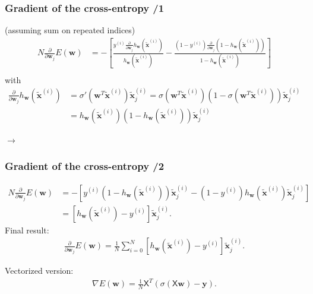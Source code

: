 \documentclass{beamer}
\begin{document}
	\begin{frame}
		\frametitle{Gradient of the cross-entropy /1}
	
		(assuming sum on repeated indices)
		\begin{align*}
			N\frac{\partial}{\partial \bm{w}_j} E(\bm{w}) &= - \left[\frac{y^{(i)} \frac{\partial}{\partial \bm{w}_j}h_{\bm{w}}(\tilde{\bm{x}}^{(i)})}{h_{\bm{w}}(\tilde{\bm{x}}^{(i)})} - \frac{(1-y^{(i)}) \frac{\partial}{\partial \bm{w}_j}(1 -h_{\bm{w}}(\tilde{\bm{x}}^{(i)}))}{1-h_{\bm{w}}(\tilde{\bm{x}}^{(i)})}\right]\\
		\end{align*}
		with
		\begin{align*}
			\frac{\partial}{\partial \bm{w}_j} h_{\bm{w}}(\tilde{\bm{x}}^{(i)}) &= \sigma'(\bm{w}^T \tilde{\bm{x}}^{(i)}) \tilde{\bm{x}}^{(i)}_j = \sigma(\bm{w}^T\tilde{\bm{x}}^{(i)})(1 - \sigma(\bm{w}^T \tilde{\bm{x}}^{(i)}))\tilde{\bm{x}}^{(i)}_j\\
			&= h_{\bm{w}}(\tilde{\bm{x}}^{(i)})(1 - h_{\bm{w}}(\tilde{\bm{x}}^{(i)}))\tilde{\bm{x}}^{(i)}_j 
		\end{align*}
	
	\mbox{}\hfill $\rightarrow$
	
	\end{frame}

	\begin{frame}
		\frametitle{Gradient of the cross-entropy /2}
		\begin{align*}
			N\frac{\partial}{\partial \bm{w}_j} E(\bm{w})&= -[y^{(i)}(1 - h_{\bm{w}}(\tilde{\bm{x}}^{(i)}))\tilde{\bm{x}}^{(i)}_j - (1-y^{(i)})h_{\bm{w}}(\tilde{\bm{x}}^{(i)})\tilde{\bm{x}}^{(i)}_j]\\
			& = [h_{\bm{w}}(\tilde{\bm{x}}^{(i)})- y^{(i)}]\tilde{\bm{x}}^{(i)}_j.
		\end{align*}
	Final result:
		\begin{align*}
			\frac{\partial}{\partial \bm{w}_j} E(\bm{w}) = \frac{1}{N} \sum_{i=0}^{N} [h_{\bm{w}}(\tilde{\bm{x}}^{(i)})- y^{(i)}]\tilde{\bm{x}}^{(i)}_j.
		\end{align*}
	
	Vectorized version:
	\begin{align*}
		\nabla E(\bm{w}) = \frac{1}{N} \mathsf{X}^T(\sigma(\mathsf{X}\bm{w}) - \bm{y}).
	\end{align*}
	
	\end{frame}
\end{document}
